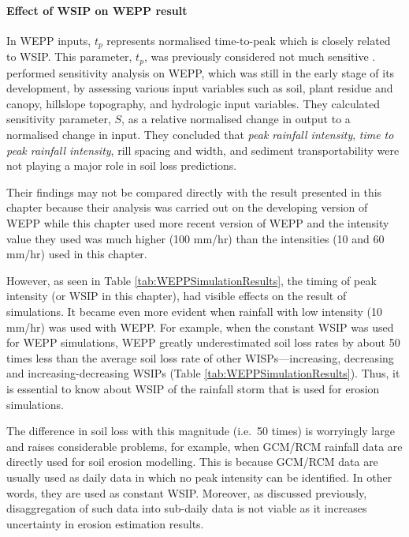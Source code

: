 \paragraph{Effect of WSIP on WEPP result} In WEPP inputs, $t_p$ represents
normalised time-to-peak which is closely related to WSIP. This parameter, $t_p$,
was previously considered not much sensitive \citep{nearing1990-839}.
\citet{nearing1990-839} performed sensitivity analysis on WEPP, which was
still in the early stage of its development, by assessing various input
variables such as soil, plant residue and canopy, hillslope topography, and
hydrologic input variables. They calculated sensitivity parameter, $S$, as a
relative normalised change in output to a normalised change in input.
They concluded that \emph{peak rainfall intensity}, \emph{time to peak rainfall
intensity}, rill spacing and width, and sediment transportability were not
playing a major role in soil loss predictions.

Their findings may not be compared directly with the result presented in this
chapter because their analysis was carried out on the developing version of WEPP
while this chapter used more recent version of WEPP and the intensity value they
used was much higher (100 mm/hr) than the intensities (10 and 60 mm/hr) used in
this chapter.

However, as seen in Table \ref{tab:WEPPSimulationResults}, the timing of peak
intensity (or WSIP in this chapter), had visible effects on the result of
simulations. It became even more evident when rainfall with low intensity (10
mm/hr) was used with WEPP. For example, when the constant WSIP was used for WEPP
simulations, WEPP greatly underestimated soil loss rates by about 50 times less
than the average soil loss rate of other WISPs---increasing, decreasing and
increasing-decreasing WSIPs (Table \ref{tab:WEPPSimulationResults}). Thus, it is
essential to know about WSIP of the rainfall storm that is used for erosion
simulations.

The difference in soil loss with this magnitude (i.e.\ 50 times) is worryingly
large and raises considerable problems, for example, when GCM/RCM rainfall data
are directly used for soil erosion modelling. This is because GCM/RCM data are
usually used as daily data in which no peak intensity can be identified. In
other words, they are used as constant WSIP. Moreover, as discussed previously,
disaggregation of such data into sub-daily data is not viable as it increases
uncertainty in erosion estimation results.

